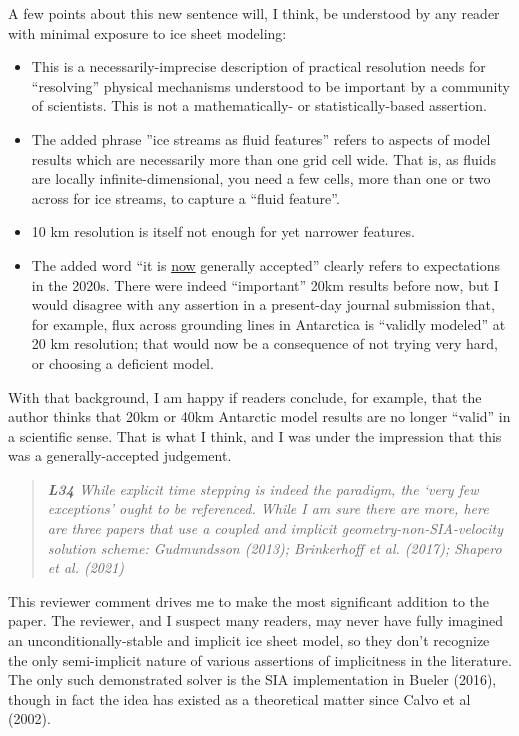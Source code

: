 \documentclass[letterpaper,final,12pt,reqno]{amsart}
\newenvironment{review}%
{\bigskip \par \begin{quote} \selectfont \sl}%
{\end{quote}}
\begin{document}
\noindent A few points about this new sentence will, I think, be understood by any reader with minimal exposure to ice sheet modeling:
\begin{itemize}
\item This is a necessarily-imprecise description of practical resolution needs for ``resolving'' physical mechanisms understood to be important by a community of scientists.  This is not a mathematically- or statistically-based assertion.
\item The added phrase ''ice streams as fluid features'' refers to aspects of model results which are necessarily more than one grid cell wide.  That is, as fluids are locally infinite-dimensional, you need a few cells, more than one or two across for ice streams, to capture a ``fluid feature''.
\item 10 km resolution is itself not enough for yet narrower features.
\item The added word ``it is \underline{now} generally accepted'' clearly refers to expectations in the 2020s.  There were indeed ``important'' 20km results before now, but I would disagree with any assertion in a present-day journal submission that, for example, flux across grounding lines in Antarctica is ``validly modeled'' at 20 km resolution; that would now be a consequence of not trying very hard, or choosing a deficient model.
\end{itemize}
With that background, I am happy if readers conclude, for example, that the author thinks that 20km or 40km Antarctic model results are no longer ``valid'' in a scientific sense.  That is what I think, and I was under the impression that this was a generally-accepted judgement.

\begin{review}
\textbf{L34}  While explicit time stepping is indeed the paradigm, the ‘very few exceptions’ ought to be referenced.  While I am sure there are more, here are three papers that use a coupled and implicit geometry-non-SIA-velocity solution scheme: Gudmundsson (2013); Brinkerhoff et al. (2017); Shapero et al. (2021)
\end{review}

\noindent This reviewer comment drives me to make the most significant addition to the paper.  The reviewer, and I suspect many readers, may never have fully imagined an unconditionally-stable and implicit ice sheet model, so they don't recognize the only semi-implicit nature of various assertions of implicitness in the literature.  The only such demonstrated solver is the SIA implementation in Bueler (2016), though in fact the idea has existed as a theoretical matter since Calvo et al (2002).
\end{document}
